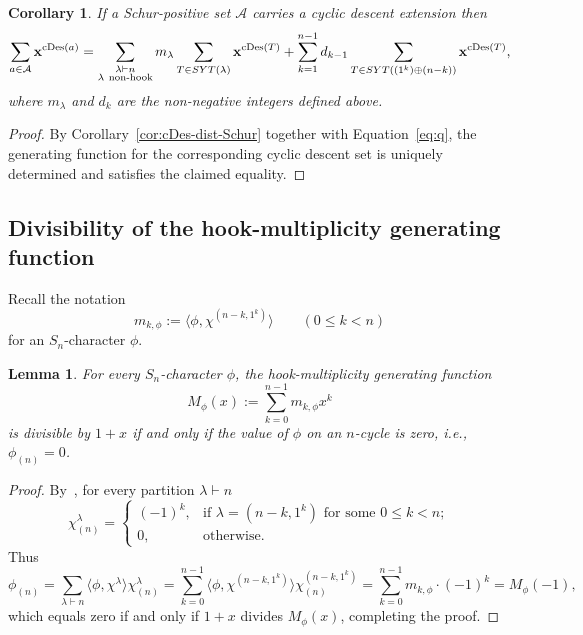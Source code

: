 \documentclass[10pt]{article}
\newtheorem{lemma}[theorem]{Lemma}
\newtheorem{corollary}[theorem]{Corollary}
\theoremstyle{definition}
\newcommand{\A}{\mathcal A}
\DeclareMathOperator\cDes{cDes}
\def\SYT{{\rm SYT}}
\begin{document}
\begin{corollary}
    If a Schur-positive set $\A$ carries a cyclic descent extension then 
    \[
        \sum_{a\in \A} {\bf x}^{\cDes(a)} = \sum_{\substack{\lambda\vdash n \\ \lambda\ \text{non-hook}}} m_\lambda 
        \sum_{T\in \SYT(\lambda)} {\bf x}^{\cDes(T)} + 	\sum_{k=1}^{n-1} d_{k-1}
        \sum_{T\in \SYT((1^k)\oplus (n-k))}{\bf x}^{\cDes(T)},
    \]
    where $m_\lambda$ and $d_k$ are the non-negative integers defined above.
\end{corollary}

\begin{proof}
    By Corollary~\ref{cor:cDes-dist-Schur}
	together with Equation~\eqref{eq:q}, 
	the generating function for the corresponding cyclic descent set is uniquely determined	and satisfies 
    the claimed equality.
\end{proof}
	
	
\subsection{Divisibility of the hook-multiplicity generating  function}
\label{sec:divisibility}	
	
Recall the notation 
\[
    m_{k,\phi} :=
    \langle \phi,\chi^{(n-k,1^k)} \rangle 
    \qquad (0 \le k < n)
\]
for an $S_n$-character $\phi$.

\begin{lemma}\label{lem:div}
    For every $S_n$-character $\phi$, the hook-multiplicity generating function 
    \[
    M_\phi(x) 
    := \sum\limits_{k=0}^{n-1} m_{k,\phi} x^k
    \]
    is divisible by $1+x$ if and only if 
    the value of $\phi$ on an $n$-cycle is zero, i.e.,  $\phi_{(n)}=0$. 
\end{lemma}

\begin{proof}
    By~\cite[Lemma 4.10.3]{Sagan},  
    for every partition $\lambda\vdash n$ 
    \[
        \chi^\lambda_{(n)} =
        \begin{cases} 
            (-1)^k,&\text{if } \lambda = (n-k,1^k) \text{ for some } 0 \le k < n;\\
		  0,&\text{otherwise.}
		\end{cases}
    \]
    Thus   
    \[
        \phi_{(n)}
        = \sum\limits_{\lambda\vdash n} \langle \phi,\chi^\lambda \rangle \chi^\lambda_{(n)}
        = \sum\limits_{k=0}^{n-1} \langle \phi,\chi^{(n-k,1^k)} \rangle \chi^{(n-k,1^k)}_{(n)}
        = \sum\limits_{k=0}^{n-1} m_{k,\phi} \cdot (-1)^k
        = M_\phi(-1),
    \]
    which equals zero if and only if $1+x$ divides $ M_\phi(x)$, 
    completing the proof.
\end{proof}
\end{document}
